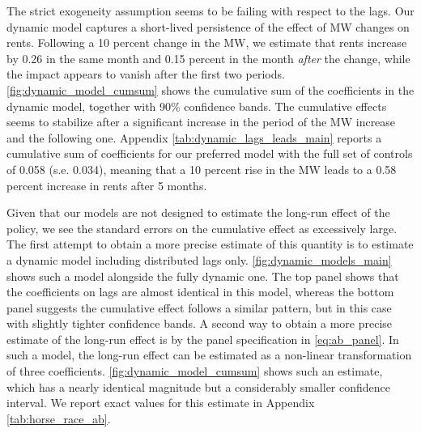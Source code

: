 The strict exogeneity assumption seems to be failing with respect to the lags. Our dynamic model 
captures a short-lived persistence of the effect of MW changes on rents. Following a 10 percent 
change in the MW, we estimate that rents increase by 0.26 in the same month and 0.15 percent in the 
month \textit{after} the change, while the impact appears to vanish after the first two periods. 
\autoref{fig:dynamic_model_cumsum} shows the cumulative sum of the coefficients in the dynamic model,
together with 90\% confidence bands. The cumulative effects seems to stabilize after a significant 
increase in the period of the MW increase and the following one. Appendix \autoref{tab:dynamic_lags_leads_main}
reports a cumulative sum of coefficients for our preferred model with the full set of controls 
of 0.058 (s.e. 0.034), meaning that a 10 percent rise in the MW leads to a 0.58 percent increase 
in rents after 5 months.

Given that our models are not designed to estimate the long-run effect of the policy, we see the
standard errors on the cumulative effect as excessively large. The first attempt to obtain a more
precise estimate of this quantity is to estimate a dynamic model including distributed lags only. 
\autoref{fig:dynamic_models_main} shows such a model alongside the fully dynamic one. The top panel 
shows that the coefficients on lags are almost identical in this model, whereas the bottom panel 
suggests the cumulative effect follows a similar pattern, but in this case with slightly tighter 
confidence bands. A second way to obtain a more precise estimate of the long-run effect is by the 
panel specification in \autoref{eq:ab_panel}. In such a model, the long-run effect can be estimated 
as a non-linear transformation of three coefficients. \autoref{fig:dynamic_model_cumsum} shows such 
an estimate, which has a nearly identical magnitude but a considerably smaller confidence interval.
We report exact values for this estimate in Appendix \autoref{tab:horse_race_ab}.

